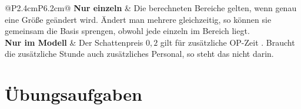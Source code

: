 \begin{warnung}
\begin{center}
{\small
\renewcommand{\arraystretch}{1.5}
\begin{tabular}{@{}P{2.4cm}P{6.2cm}@{}}
\toprule
\textbf{Nur einzeln} & Die berechneten Bereiche gelten, wenn genau eine Größe geändert wird. Ändert man mehrere gleichzeitig, so können sie gemeinsam die Basis sprengen, obwohl jede einzeln im Bereich liegt.\\
\textbf{Nur im Modell} & Der Schattenpreis $0{,}2$ gilt für zusätzliche OP-Zeit . Braucht die zusätzliche Stunde auch zusätzliches Personal, so steht das nicht darin.\\
\bottomrule
\end{tabular}}
\end{center}

\begin{center}
\begin{minipage}{0.88\textwidth}
\end{minipage}
\end{center}
\end{warnung}

\section{Übungsaufgaben}

